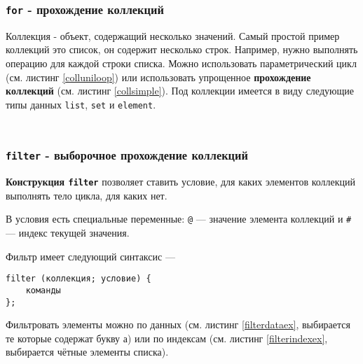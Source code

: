 \begin{sourcecode}
	\label{dowhileex}
    \inputminted[linenos]{icl}{../sources/dowhileex.icL}
\end{sourcecode}

\subsubsection{\texttt{for} - прохождение коллекций}

{Коллекция} - объект, содержащий несколько значений. Самый простой пример коллекций это список, он содержит несколько строк. Например, нужно выполнять операцию для каждой строки списка. Можно использовать параметрический цикл (см. листинг \ref{colluniloop}) или использовать упрощенное {\bf прохождение коллекций} (см. листинг \ref{collsimple}). Под коллекции имеется в виду следующие типы данных \texttt{list}, \texttt{set} и \texttt{element}.
\begin{sourcecode}
	\label{colluniloop}
    \inputminted[linenos]{icl}{../sources/colluniloop.icL}
\end{sourcecode}

\begin{sourcecode}
	\label{collsimple}
    \inputminted[linenos]{icl}{../sources/collsimple.icL}
\end{sourcecode}

\subsubsection{\texttt{filter} - выборочное прохождение коллекций}

{\bf Конструкция \texttt{filter}} позволяет ставить условие, для каких элементов коллекций выполнять тело цикла, для каких нет.

В условия есть специальные переменные: \texttt{@} — значение элемента коллекций и \texttt{#} — индекс текущей значения.

Фильтр имеет следующий синтаксис —
\begin{verbatim}
filter (коллекция; условие) {
	команды
};
\end{verbatim}

Фильтровать элементы можно по данных (см. листинг \ref{filterdataex}, выбирается те которые содержат букву а) или по индексам (см. листинг \ref{filterindexex}, выбирается чётные элементы списка).

